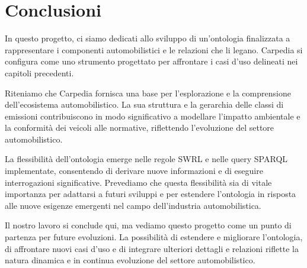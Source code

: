 \chapter{Conclusioni}

In questo progetto, ci siamo dedicati allo sviluppo di un'ontologia finalizzata a rappresentare i componenti automobilistici e le relazioni che li legano. Carpedia si configura come uno strumento progettato per affrontare i casi d'uso delineati nei capitoli precedenti.

Riteniamo che Carpedia fornisca una base per l'esplorazione e la comprensione dell'ecosistema automobilistico. La sua struttura e la gerarchia delle classi di emissioni contribuiscono in modo significativo a modellare l'impatto ambientale e la conformità dei veicoli alle normative, riflettendo l'evoluzione del settore automobilistico.

La flessibilità dell'ontologia emerge nelle regole SWRL e nelle query SPARQL implementate, consentendo di derivare nuove informazioni e di eseguire interrogazioni significative. Prevediamo che questa flessibilità sia di vitale importanza per adattarsi a futuri sviluppi e per estendere l'ontologia in risposta alle nuove esigenze emergenti nel campo dell'industria automobilistica.

Il nostro lavoro si conclude qui, ma vediamo questo progetto come un punto di partenza per future evoluzioni. La possibilità di estendere e migliorare l'ontologia, di affrontare nuovi casi d'uso e di integrare ulteriori dettagli e relazioni riflette la natura dinamica e in continua evoluzione del settore automobilistico.
